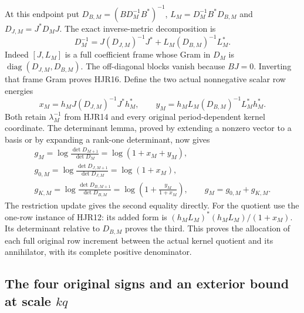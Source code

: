 \documentclass[11pt,a4paper]{article}
\begin{document}
At this endpoint put
$D_{B,M}=(BD_M^{-1}B^*)^{-1}$,
$L_M=D_M^{-1}B^*D_{B,M}$ and $D_{J,M}=J^*D_MJ$.
The exact inverse-metric decomposition is
\[
 D_M^{-1}
 =J(D_{J,M})^{-1}J^*
          +L_M(D_{B,M})^{-1}L_M^* .
 \tag{HJR16}
\]
Indeed $[J,L_M]$ is a full coefficient frame whose Gram in
$D_M$ is $\operatorname{diag}(D_{J,M},D_{B,M})$.
The off-diagonal blocks vanish because $BJ=0$.
Inverting that frame Gram proves HJR16.
Define the two actual nonnegative scalar row energies
\[
 x_M=h_MJ(D_{J,M})^{-1}J^*h_M^*,\qquad
 y_M=h_ML_M(D_{B,M})^{-1}L_M^*h_M^* .
 \tag{HJR17}
\]
Both retain $\lambda_M^{-1}$ from HJR14 and every original
period-dependent kernel coordinate. The determinant lemma,
proved by extending a nonzero vector to a basis or by
expanding a rank-one determinant, now gives
\[
 \begin{gathered}
 g_M=\log\frac{\det D_{M+1}}{\det D_M}
                  =\log(1+x_M+y_M),\\
 g_{0,M}=\log\frac{\det D_{J,M+1}}{\det D_{J,M}}
                  =\log(1+x_M),\\
 g_{K,M}=\log\frac{\det D_{B,M+1}}{\det D_{B,M}}
                  =\log\left(1+\frac{y_M}{1+x_M}\right),\qquad
 g_M=g_{0,M}+g_{K,M}.
 \end{gathered}\tag{HJR18}
\]
The restriction update gives the second equality directly.
For the quotient use the one-row instance of HJR12: its
added form is $(h_ML_M)^*(h_ML_M)/(1+x_M)$.
Its determinant relative to $D_{B,M}$ proves the third.
This proves the allocation of each full original row
increment between the actual kernel quotient and its
annihilator, with its complete positive denominator.

\subsection{The four original signs and an exterior bound at scale \(kq\)}
\end{document}
